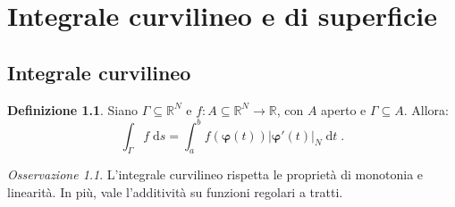 \documentclass[a4paper,12pt]{report}
\theoremstyle{plain}
\theoremstyle{definition}
\newtheorem{defn}{Definizione}[section]
\theoremstyle{remark}
\newtheorem{oss}{Osservazione}[section]
\newcommand{\diff}[1]{\mathrm{d}#1}
\numberwithin{equation}{section}
\begin{document}
\chapter{Integrale curvilineo e di superficie}
\section{Integrale curvilineo}
\begin{defn} Siano $\Gamma\subseteq\mathbb{R}^N$ e $f:A\subseteq\mathbb{R}^N\to\mathbb{R}$, con $A$ aperto e $\Gamma\subseteq A$. Allora:
\begin{equation}
\int_{\Gamma}f\;\diff{s}=\int_a^b f(\boldsymbol{\varphi}(t))|\boldsymbol{\varphi}'(t)|_N\;\diff{t}\;.
\end{equation}
\end{defn}
\begin{oss} L'integrale curvilineo rispetta le proprietà di monotonia e linearità. In più, vale l'additività su funzioni regolari a tratti.
\end{oss}
\end{document}

